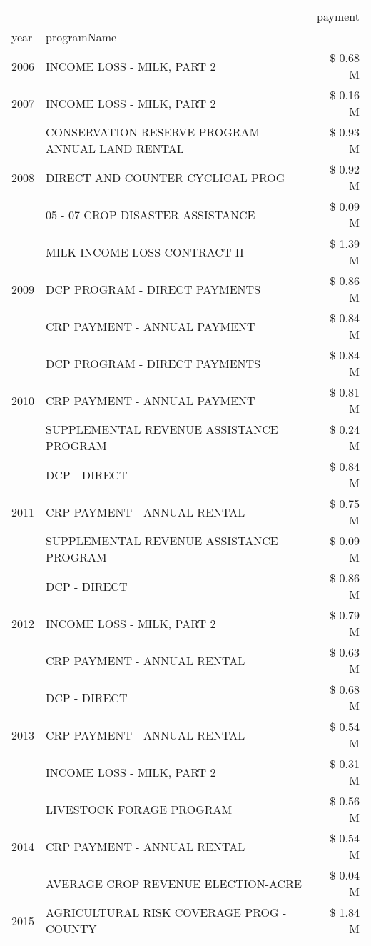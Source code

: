 \begin{tabular}{llr}
\toprule
 &  & payment \\
year & programName &  \\
\midrule
2006 & INCOME LOSS - MILK, PART 2 & \$ 0.68 M \\
\cline{1-3}
2007 & INCOME LOSS - MILK, PART 2 & \$ 0.16 M \\
\cline{1-3}
\multirow[t]{3}{*}{2008} & CONSERVATION RESERVE PROGRAM - ANNUAL LAND RENTAL & \$ 0.93 M \\
 & DIRECT AND COUNTER CYCLICAL PROG & \$ 0.92 M \\
 & 05 - 07 CROP DISASTER ASSISTANCE & \$ 0.09 M \\
\cline{1-3}
\multirow[t]{3}{*}{2009} & MILK INCOME LOSS CONTRACT II & \$ 1.39 M \\
 & DCP PROGRAM - DIRECT PAYMENTS & \$ 0.86 M \\
 & CRP PAYMENT - ANNUAL PAYMENT & \$ 0.84 M \\
\cline{1-3}
\multirow[t]{3}{*}{2010} & DCP PROGRAM - DIRECT PAYMENTS & \$ 0.84 M \\
 & CRP PAYMENT - ANNUAL PAYMENT & \$ 0.81 M \\
 & SUPPLEMENTAL REVENUE ASSISTANCE PROGRAM & \$ 0.24 M \\
\cline{1-3}
\multirow[t]{3}{*}{2011} & DCP - DIRECT & \$ 0.84 M \\
 & CRP PAYMENT - ANNUAL RENTAL & \$ 0.75 M \\
 & SUPPLEMENTAL REVENUE ASSISTANCE PROGRAM & \$ 0.09 M \\
\cline{1-3}
\multirow[t]{3}{*}{2012} & DCP - DIRECT & \$ 0.86 M \\
 & INCOME LOSS - MILK, PART 2 & \$ 0.79 M \\
 & CRP PAYMENT - ANNUAL RENTAL & \$ 0.63 M \\
\cline{1-3}
\multirow[t]{3}{*}{2013} & DCP - DIRECT & \$ 0.68 M \\
 & CRP PAYMENT - ANNUAL RENTAL & \$ 0.54 M \\
 & INCOME LOSS - MILK, PART 2 & \$ 0.31 M \\
\cline{1-3}
\multirow[t]{3}{*}{2014} & LIVESTOCK FORAGE PROGRAM & \$ 0.56 M \\
 & CRP PAYMENT - ANNUAL RENTAL & \$ 0.54 M \\
 & AVERAGE CROP REVENUE ELECTION-ACRE & \$ 0.04 M \\
\cline{1-3}
\multirow[t]{3}{*}{2015} & AGRICULTURAL RISK COVERAGE PROG - COUNTY & \$ 1.84 M \\

\end{tabular}
